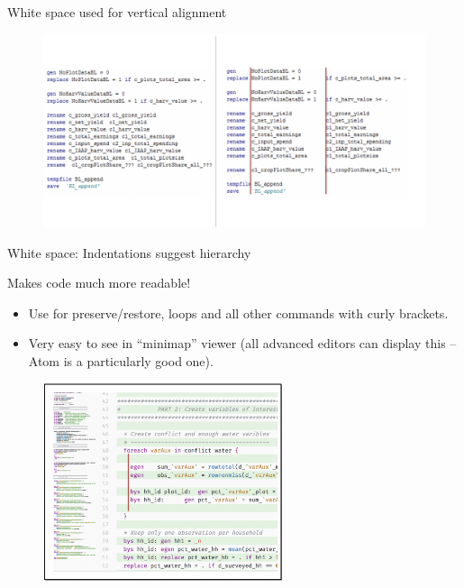 \documentclass[aspectratio=169]{beamer}
\begin{document}
\begin{frame}{White space used for vertical alignment}

	\begin{figure}
		\centering
		\includegraphics[width=\linewidth]{img/White_space}
	\end{figure}

\end{frame}


\begin{frame}[fragile]{White space: Indentations suggest hierarchy}
\begin{multicols}{2}	
	
	Makes code much more readable!
	
	\begin{itemize}[<default overlay specification>]
		\item<1>  Use for preserve/restore, loops and all other commands with curly brackets. 
		\item<1>  Very easy to see in “minimap” viewer (all advanced editors can display this – Atom is a particularly good one).
	\end{itemize}
	
	\begin{figure}
		\centering
		\includegraphics[width=70mm, right]{img/WHite_space2}
	\end{figure}
	
\end{multicols}
\end{frame}
\end{document}

